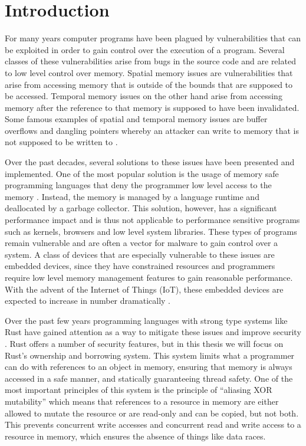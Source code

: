 \chapter{Introduction}
\label{cha:intro}
For many years computer programs have been plagued by vulnerabilities that can be exploited in order to gain control over the execution of a program.
Several classes of these vulnerabilities arise from bugs in the source code and are related to low level control over memory.
Spatial memory issues are vulnerabilities that arise from accessing memory that is outside of the bounds that are supposed to be accessed.
Temporal memory issues on the other hand arise from accessing memory after the reference to that memory is supposed to have been invalidated.
Some famous examples of spatial and temporal memory issues are buffer overflows and dangling pointers whereby an attacker can write to memory that is not supposed to be written to \cite{van_der_veen_memory_2012}.

Over the past decades, several solutions to these issues have been presented and implemented.
One of the most popular solution is the usage of memory safe programming languages that deny the programmer low level access to the memory \cite{10.1145/780731.780743}.
Instead, the memory is managed by a language runtime and deallocated by a garbage collector.
This solution, however, has a significant performance impact \cite{10.1145/1094811.1094836} and is thus not applicable to performance sensitive programs such as kernels, browsers and low level system libraries.
These types of programs remain vulnerable and are often a vector for malware to gain control over a system.
A class of devices that are especially vulnerable to these issues are embedded devices, since they have constrained resources and programmers require low level memory management features to gain reasonable performance.
With the advent of the Internet of Things (IoT), these embedded devices are expected to increase in number dramatically \cite{8688434}.

Over the past few years programming languages with strong type systems like Rust have gained attention as a way to mitigate these issues and improve security \cite{10.1145/2692956.2663188}.
Rust offers a number of security features, but in this thesis we will focus on Rust's ownership and borrowing system.
This system limits what a programmer can do with references to an object in memory, ensuring that memory is always accessed in a safe manner, and statically guaranteeing thread safety.
One of the most important principles of this system is the principle of ``aliasing XOR mutability'' which means that references to a resource in memory are either allowed to mutate the resource or are read-only and can be copied, but not both.
This prevents concurrent write accesses and concurrent read and write access to a resource in memory, which ensures the absence of things like data races.

